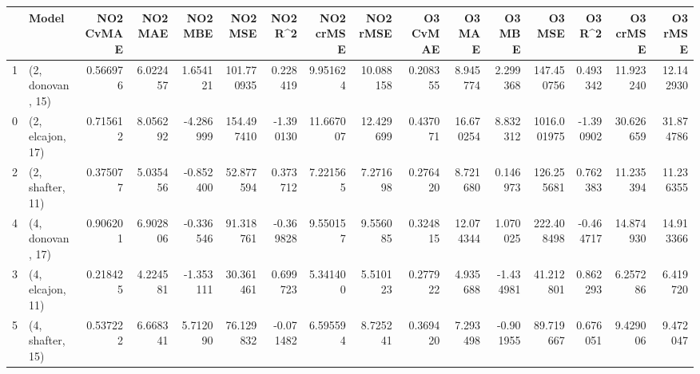 \begin{tabular}{llrrrrrrrrrrrrrr}
\toprule
{} &             Model &  NO2 CvMAE &   NO2 MAE &   NO2 MBE &     NO2 MSE &   NO2 R\textasciicircum2 &  NO2 crMSE &   NO2 rMSE &  O3 CvMAE &     O3 MAE &    O3 MBE &       O3 MSE &    O3 R\textasciicircum2 &   O3 crMSE &    O3 rMSE \\
\midrule
1 &  (2, donovan, 15) &   0.566976 &  6.022457 &  1.654121 &  101.770935 &  0.228419 &   9.951624 &  10.088158 &  0.208355 &   8.945774 &  2.299368 &   147.450756 &  0.493342 &  11.923240 &  12.142930 \\
0 &  (2, elcajon, 17) &   0.715612 &  8.056292 & -4.286999 &  154.497410 & -1.390130 &  11.667007 &  12.429699 &  0.437071 &  16.670254 &  8.832312 &  1016.001975 & -1.390902 &  30.626659 &  31.874786 \\
2 &  (2, shafter, 11) &   0.375077 &  5.035456 & -0.852400 &   52.877594 &  0.373712 &   7.221565 &   7.271698 &  0.276420 &   8.721680 &  0.146973 &   126.255681 &  0.762383 &  11.235394 &  11.236355 \\
4 &  (4, donovan, 17) &   0.906201 &  6.902806 & -0.336546 &   91.318761 & -0.369828 &   9.550157 &   9.556085 &  0.324815 &  12.074344 &  1.070025 &   222.408498 & -0.464717 &  14.874930 &  14.913366 \\
3 &  (4, elcajon, 11) &   0.218425 &  4.224581 & -1.353111 &   30.361461 &  0.699723 &   5.341400 &   5.510123 &  0.277922 &   4.935688 & -1.434981 &    41.212801 &  0.862293 &   6.257286 &   6.419720 \\
5 &  (4, shafter, 15) &   0.537222 &  6.668341 &  5.712090 &   76.129832 & -0.071482 &   6.595594 &   8.725241 &  0.369420 &   7.293498 & -0.901955 &    89.719667 &  0.676051 &   9.429006 &   9.472047 \\
\bottomrule
\end{tabular}
